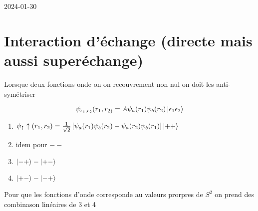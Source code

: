 


2024-01-30

\section*{Interaction d'échange (directe mais aussi superéchange)}

Lorsque deux fonctions onde on on recouvrement non nul on doit les anti-symétriser


\[ \psi_{\epsilon_1 ,\epsilon_{2}} (r_1 , r_{2)} = A \psi_a (r_{1}) \psi_b(r_2 ) \ket{\epsilon_1 \epsilon_2 } \]

\begin{enumerate}
	\item $\psi_\uparrow\uparrow (r_1, r_2) = \frac{1}{\sqrt{2} } \left[ \psi_a(r_1) \psi_b (r_2 ) - \psi_a (r_2 ) \psi_b (r_1)\right] \ket{++}$
\item idem pour $--$
\item $\ket{-+} - \ket{+-}$	
\item $\ket{+-} - \ket{-+}$	

\end{enumerate}

Pour que les fonctions d'onde corresponde au valeurs prorpres de $S^2$ on prend des combinason linéaires de 3 et 4 






